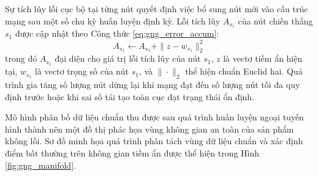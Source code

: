 Sự tích lũy lỗi cục bộ tại từng nút quyết định việc bổ sung nút mới vào cấu trúc mạng sau một số chu kỳ huấn luyện định kỳ. Lỗi tích lũy $A_{s_1}$ của nút chiến thắng $s_1$ được cập nhật theo Công thức \ref{eq:gng_error_accum}:
\begin{equation}
\label{eq:gng_error_accum}
A_{s_1} \leftarrow A_{s_1} + \| z - w_{s_1} \|_2^2
\end{equation}
trong đó $A_{s_1}$ đại diện cho giá trị lỗi tích lũy của nút $s_1$, $z$ là vectơ tiềm ẩn hiện tại, $w_{s_1}$ là vectơ trọng số của nút $s_1$, và $\| \cdot \|_2$ thể hiện chuẩn Euclid hai. Quá trình gia tăng số lượng nút dừng lại khi mạng đạt đến số lượng nút tối đa quy định trước hoặc khi sai số tái tạo toàn cục đạt trạng thái ổn định.

Mô hình phân bố dữ liệu chuẩn thu được sau quá trình huấn luyện ngoại tuyến hình thành nên một đồ thị phác họa vùng không gian an toàn của sản phẩm không lỗi. Sơ đồ minh họa quá trình phân tách vùng dữ liệu chuẩn và xác định điểm bất thường trên không gian tiềm ẩn được thể hiện trong Hình \ref{fig:gng_manifold}.

